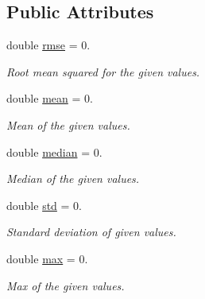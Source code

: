 \subsection*{Public Attributes}
\begin{DoxyCompactItemize}
\item 
\mbox{\label{structov__eval_1_1Statistics_a86b2905802456b6a1d8b6bcacb9a9e39}} 
double \hyperlink{structov__eval_1_1Statistics_a86b2905802456b6a1d8b6bcacb9a9e39}{rmse} = 0.
\begin{DoxyCompactList}\small\item\em Root mean squared for the given values. \end{DoxyCompactList}\item 
\mbox{\label{structov__eval_1_1Statistics_ab3fe9611541840f445f1e28a5181b2eb}} 
double \hyperlink{structov__eval_1_1Statistics_ab3fe9611541840f445f1e28a5181b2eb}{mean} = 0.
\begin{DoxyCompactList}\small\item\em Mean of the given values. \end{DoxyCompactList}\item 
\mbox{\label{structov__eval_1_1Statistics_a44b7c68c982ad20d064bd2f6168e60be}} 
double \hyperlink{structov__eval_1_1Statistics_a44b7c68c982ad20d064bd2f6168e60be}{median} = 0.
\begin{DoxyCompactList}\small\item\em Median of the given values. \end{DoxyCompactList}\item 
\mbox{\label{structov__eval_1_1Statistics_a955e40e0c9a32572c2d72815904d52be}} 
double \hyperlink{structov__eval_1_1Statistics_a955e40e0c9a32572c2d72815904d52be}{std} = 0.
\begin{DoxyCompactList}\small\item\em Standard deviation of given values. \end{DoxyCompactList}\item 
\mbox{\label{structov__eval_1_1Statistics_a3c199c37bd66fa83acfe4eebc279dd34}} 
double \hyperlink{structov__eval_1_1Statistics_a3c199c37bd66fa83acfe4eebc279dd34}{max} = 0.
\begin{DoxyCompactList}\small\item\em Max of the given values. \end{DoxyCompactList}\item 

\end{DoxyCompactItemize}
